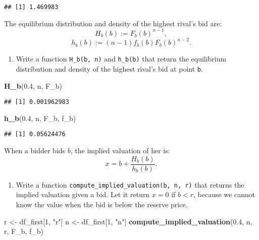 \documentclass[
]{book}
\newenvironment{Shaded}{\begin{snugshade}}{\end{snugshade}}
\newcommand{\DecValTok}[1]{\textcolor[rgb]{0.00,0.00,0.81}{#1}}
\newcommand{\FloatTok}[1]{\textcolor[rgb]{0.00,0.00,0.81}{#1}}
\newcommand{\KeywordTok}[1]{\textcolor[rgb]{0.13,0.29,0.53}{\textbf{#1}}}
\newcommand{\NormalTok}[1]{#1}
\newcommand{\StringTok}[1]{\textcolor[rgb]{0.31,0.60,0.02}{#1}}
\providecommand{\tightlist}{%
  \setlength{\itemsep}{0pt}\setlength{\parskip}{0pt}}
\begin{document}
\begin{verbatim}
## [1] 1.469983
\end{verbatim}

The equilibrium distribution and density of the highest rival's bid are:
\[
H_b(b) := F_b(b)^{n - 1},
\]
\[
h_b(b) := (n - 1) f_b(b) F_b(b)^{n - 2}.
\]

\begin{enumerate}
\def\labelenumi{\arabic{enumi}.}
\setcounter{enumi}{10}
\tightlist
\item
  Write a function \texttt{H\_b(b,\ n)} and \texttt{h\_b(b)} that return the equilibrium distribution and density of the highest rival's bid at point \texttt{b}.
\end{enumerate}

\begin{Shaded}
\begin{Highlighting}[]
\KeywordTok{H_b}\NormalTok{(}\FloatTok{0.4}\NormalTok{, n, F_b)}
\end{Highlighting}
\end{Shaded}

\begin{verbatim}
## [1] 0.001962983
\end{verbatim}

\begin{Shaded}
\begin{Highlighting}[]
\KeywordTok{h_b}\NormalTok{(}\FloatTok{0.4}\NormalTok{, n, F_b, f_b)}
\end{Highlighting}
\end{Shaded}

\begin{verbatim}
## [1] 0.05624476
\end{verbatim}

When a bidder bids \(b\), the implied valuation of her is:
\[
x = b + \frac{H_b(b)}{h_b(b)}.
\]

\begin{enumerate}
\def\labelenumi{\arabic{enumi}.}
\setcounter{enumi}{11}
\tightlist
\item
  Write a function \texttt{compute\_implied\_valuation(b,\ n,\ r)} that returns the implied valuation given a bid. Let it return \(x = 0\) if \(b < r\), because we cannot know the value when the bid is below the reserve price.
\end{enumerate}

\begin{Shaded}
\begin{Highlighting}[]
\NormalTok{r <-}\StringTok{ }\NormalTok{df_first[}\DecValTok{1}\NormalTok{, }\StringTok{"r"}\NormalTok{]}
\NormalTok{n <-}\StringTok{ }\NormalTok{df_first[}\DecValTok{1}\NormalTok{, }\StringTok{"n"}\NormalTok{]}
\KeywordTok{compute_implied_valuation}\NormalTok{(}\FloatTok{0.4}\NormalTok{, n, r, F_b, f_b)}
\end{Highlighting}
\end{Shaded}
\end{document}
